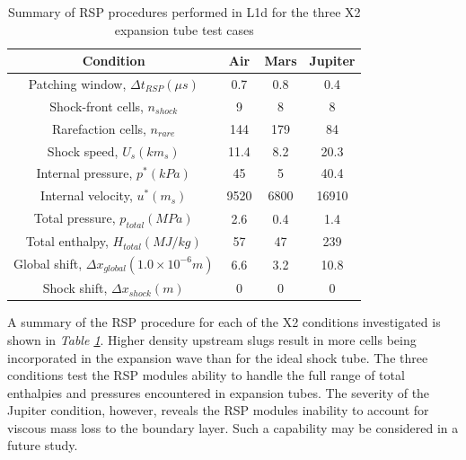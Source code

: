 \documentclass[a4paper,10pt]{article}
\begin{document}
\begin{table}[htb]
\begin{center}  %
\begin{tabular*}{0.8\textwidth}%
     {@{\extracolsep{\fill}}cccc}
\hline \hline \textbf{Condition}                                     & \textbf{Air}    & \textbf{Mars} & \textbf{Jupiter} \\
\hline Patching window, $\Delta t_{RSP} (\mu s)$         & 0.7    &  0.8  & 0.4    \\
Shock-front cells, $n_{shock}$                           & 9      &   8   &  8     \\
Rarefaction cells, $n_{rare}$                            & 144    &  179  &  84    \\
Shock speed, $U_{s} (km_{s})$                            & 11.4   &  8.2  &  20.3  \\
Internal pressure, $p^{*} (kPa)$                         & 45     &  5    &  40.4  \\
Internal velocity, $u^{*} (m_{s})$                       & 9520   &  6800 &  16910 \\
Total pressure, $p_{total} (MPa)$                        & 2.6    &  0.4  &  1.4   \\
Total enthalpy, $H_{total} (MJ/kg)$                      &  57    &  47   &  239   \\
Global shift, $\Delta x_{global} (1.0 \times 10^{-6} m)$ &   6.6  &  3.2  &  10.8  \\
Shock shift, $\Delta x_{shock} (m)$                      &   0    &  0    &  0     \\
\hline
\end{tabular*}
\caption{Summary of RSP procedures performed in L1d for the three X2 expansion tube test cases}
\label{table:x2_rsp}
\end{center}
\end{table}

A summary of the RSP procedure for each of the X2 conditions investigated is shown in \emph{Table \ref{table:x2_rsp}}.  Higher density upstream slugs result in more cells being incorporated in the expansion wave than for the ideal shock tube.  The three conditions test the RSP modules ability to handle the full range of total enthalpies and pressures encountered in expansion tubes.  The severity of the Jupiter condition, however, reveals the RSP modules inability to account for viscous mass loss to the boundary layer.  Such a capability may be considered in a future study.
\end{document}
